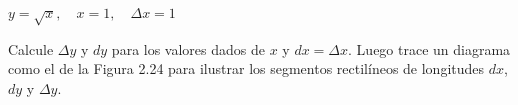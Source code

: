 \item $y = \sqrt{x}, \quad x = 1, \quad \Delta x = 1$
\par
Calcule $\Delta y$ y $dy$ para los valores dados de $x$ y $dx = \Delta x$. Luego trace un diagrama como el de la Figura 2.24 para ilustrar los segmentos rectilíneos de longitudes $dx$, $dy$ y $\Delta y$.
